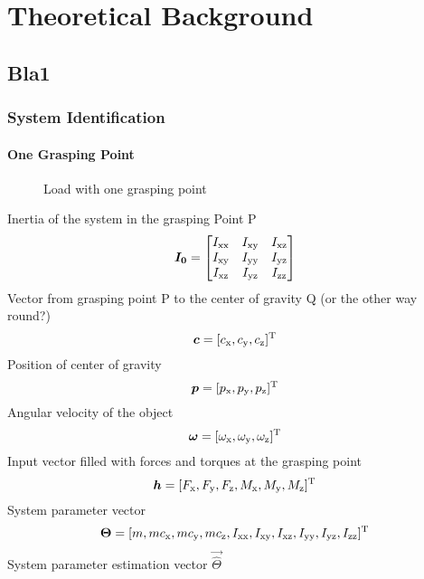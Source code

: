 

\chapter{Theoretical Background}

\section{Bla1}
\label{sec:bla1}
\lipsum[1] 

\subsection{System Identification}
\label{subsec:system_identification}

\subsubsection{One Grasping Point}
\begin{figure}
	\centering
	
	\caption{Load with one grasping point}
\end{figure}

Inertia of the system in the grasping Point P
\begin{equation}
	\boldsymbol{I_0} = 
	\begin{bmatrix}	
		I_{\mathrm{xx}}	& I_{\mathrm{xy}}	& I_{\mathrm{xz}} \\
		I_{\mathrm{xy}}	& I_{\mathrm{yy}}	& I_{\mathrm{yz}} \\
		I_{\mathrm{xz}}	& I_{\mathrm{yz}}	& I_{\mathrm{zz}}
	\end{bmatrix}
\end{equation}
Vector from grasping point P to the center of gravity Q (or the other way round?)
\begin{equation}
	\boldsymbol{c} = [c_{\mathrm{x}}, c_{\mathrm{y}}, c_{\mathrm{z}}]^{\mathrm{T}}
\end{equation}
Position of center of gravity
\begin{equation}
	\boldsymbol{p} = [p_{\mathrm{x}}, p_{\mathrm{y}}, p_{\mathrm{z}}]^{\mathrm{T}}
\end{equation}
Angular velocity of the object
\begin{equation}
	\boldsymbol{\omega} = [\omega_{\mathrm{x}}, \omega_{\mathrm{y}}, \omega_{\mathrm{z}}]^{\mathrm{T}}
\end{equation}
Input vector filled with forces and torques at the grasping point
\begin{equation}
	\boldsymbol{h} = [F_{\mathrm{x}}, F_{\mathrm{y}}, F_{\mathrm{z}}, M_{\mathrm{x}}, M_{\mathrm{y}}, M_{\mathrm{z}}]^{\mathrm{T}}
\end{equation}
System parameter vector
\begin{equation}
	\boldsymbol{\Theta} = [m, m c_{\mathrm{x}}, m c_{\mathrm{y}}, m c_{\mathrm{z}}, I_{\mathrm{xx}}, I_{\mathrm{xy}}, I_{\mathrm{xz}}, I_{\mathrm{yy}},I_{\mathrm{yz}}, I_{\mathrm{zz}}]^{\mathrm{T}}
\end{equation}
System parameter estimation vector $\vec{\hat \Theta}$


